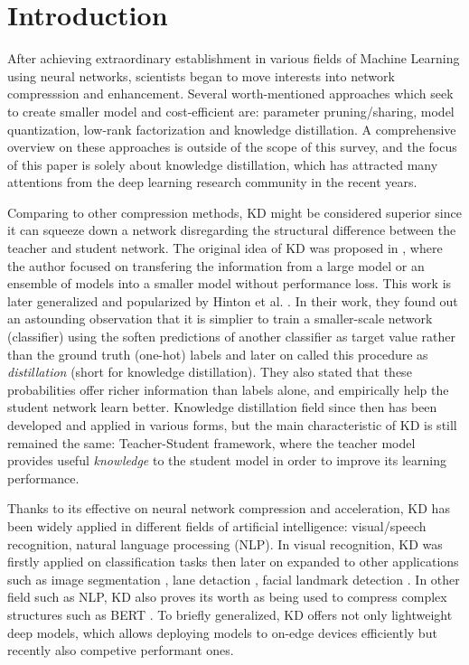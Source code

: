 \section{Introduction}

After achieving extraordinary establishment in various fields of Machine Learning using neural networks, scientists began to move interests into network compresssion and enhancement. Several worth-mentioned approaches which seek to create smaller model and cost-efficient are: parameter pruning/sharing, model quantization, low-rank factorization and knowledge distillation. A comprehensive overview on these approaches is outside of the scope of this survey, and the focus of this paper is solely about knowledge distillation, which has attracted many attentions from the deep learning research community in the recent years. 

Comparing to other compression methods, KD might be considered superior since it can squeeze down a network disregarding the structural difference between the teacher and student network. The original idea of KD was proposed in \cite{firstkdpaper}, where the author focused on transfering the information from a large model or an ensemble of models into a smaller model without performance loss. This work is later generalized and popularized by Hinton et al. \cite{hintonfirstkd}. In their work, they found out an astounding observation that it is simplier to train a smaller-scale network (classifier) using the soften predictions of another classifier as target value rather than the ground truth (one-hot) labels and later on called this procedure as \textit{distillation} (short for knowledge distillation). They also stated that these probabilities offer richer information than labels alone, and empirically help the student network learn better. Knowledge distillation field since then has been developed and applied in various forms, but the main characteristic of KD is still remained the same: Teacher-Student framework, where the teacher model provides useful \textit{knowledge} to the student model in order to improve its learning performance.

Thanks to its effective on neural network compression and acceleration, KD has been widely applied in different fields of artificial intelligence: visual/speech recognition, natural language processing (NLP). In visual recognition, KD was firstly applied on classification tasks \cite{hintonfirstkd,visualtask01,visualtask02,visualtask03,visualtask04} then later on expanded to other applications such as image segmentation \cite{segment01}, lane detaction \cite{lanedetect01}, facial landmark detection \cite{facial01, facial02}. In other field such as NLP, KD also proves its worth as being used to compress complex structures such as BERT \cite{nlp01, nlp02}. To briefly generalized, KD offers not only lightweight deep models, which allows deploying models to on-edge devices efficiently but recently also competive performant ones.

